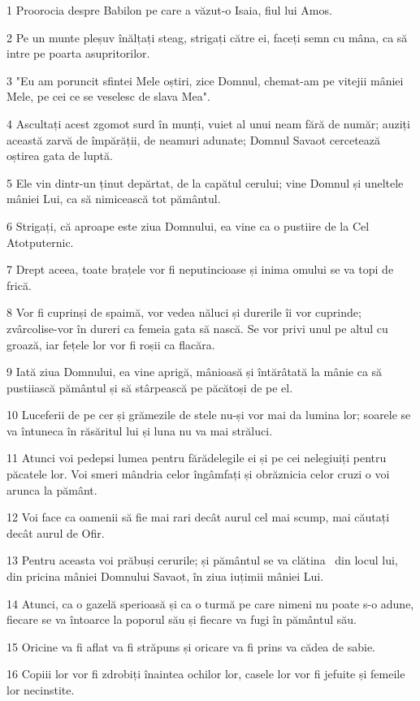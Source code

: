 \par 1 Proorocia despre Babilon pe care a văzut-o Isaia, fiul lui Amos.
\par 2 Pe un munte pleșuv înălțați steag, strigați către ei, faceți semn cu mâna, ca să intre pe poarta asupritorilor.
\par 3 "Eu am poruncit sfintei Mele oștiri, zice Domnul, chemat-am pe vitejii mâniei Mele, pe cei ce se veselesc de slava Mea".
\par 4 Ascultați acest zgomot surd în munți, vuiet al unui neam fără de număr; auziți această zarvă de împărății, de neamuri adunate; Domnul Savaot cercetează oștirea gata de luptă.
\par 5 Ele vin dintr-un ținut depărtat, de la capătul cerului; vine Domnul și uneltele mâniei Lui, ca să nimicească tot pământul.
\par 6 Strigați, că aproape este ziua Domnului, ea vine ca o pustiire de la Cel Atotputernic.
\par 7 Drept aceea, toate brațele vor fi neputincioase și inima omului se va topi de frică.
\par 8 Vor fi cuprinși de spaimă, vor vedea năluci și durerile îi vor cuprinde; zvârcolise-vor în dureri ca femeia gata să nască. Se vor privi unul pe altul cu groază, iar fețele lor vor fi roșii ca flacăra.
\par 9 Iată ziua Domnului, ea vine aprigă, mânioasă și întărâtată la mânie ca să pustiiască pământul și să stârpească pe păcătoși de pe el.
\par 10 Luceferii de pe cer și grămezile de stele nu-și vor mai da lumina lor; soarele se va întuneca în răsăritul lui și luna nu va mai străluci.
\par 11 Atunci voi pedepsi lumea pentru fărădelegile ei și pe cei nelegiuiți pentru păcatele lor. Voi smeri mândria celor îngâmfați și obrăznicia celor cruzi o voi arunca la pământ.
\par 12 Voi face ca oamenii să fie mai rari decât aurul cel mai scump, mai căutați decât aurul de Ofir.
\par 13 Pentru aceasta voi prăbuși cerurile; și pământul se va clătina  din locul lui, din pricina mâniei Domnului Savaot, în ziua iuțimii mâniei Lui.
\par 14 Atunci, ca o gazelă sperioasă și ca o turmă pe care nimeni nu poate s-o adune, fiecare se va întoarce la poporul său și fiecare va fugi în pământul său.
\par 15 Oricine va fi aflat va fi străpuns și oricare va fi prins va cădea de sabie.
\par 16 Copiii lor vor fi zdrobiți înaintea ochilor lor, casele lor vor fi jefuite și femeile lor necinstite.
